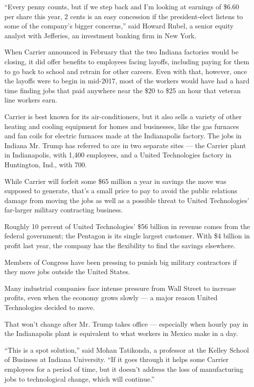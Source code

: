 ``Every penny counts, but if we step back and I'm looking at earnings of
\$6.60 per share this year, 2 cents is an easy concession if the
president-elect listens to some of the company's bigger concerns,'' said
Howard Rubel, a senior equity analyst with Jefferies, an investment
banking firm in New York.

When Carrier announced in February that the two Indiana factories would
be closing, it did offer benefits to employees facing layoffs, including
paying for them to go back to school and retrain for other careers. Even
with that, however, once the layoffs were to begin in mid-2017, most of
the workers would have had a hard time finding jobs that paid anywhere
near the \$20 to \$25 an hour that veteran line workers earn.

Carrier is best known for its air-conditioners, but it also sells a
variety of other heating and cooling equipment for homes and businesses,
like the gas furnaces and fan coils for electric furnaces made at the
Indianapolis factory. The jobs in Indiana Mr. Trump has referred to are
in two separate sites --- the Carrier plant in Indianapolis, with 1,400
employees, and a United Technologies factory in Huntington, Ind., with
700.

While Carrier will forfeit some \$65 million a year in savings the move
was supposed to generate, that's a small price to pay to avoid the
public relations damage from moving the jobs as well as a possible
threat to United Technologies' far-larger military contracting business.

Roughly 10 percent of United Technologies' \$56 billion in revenue comes
from the federal government; the Pentagon is its single largest
customer. With \$4 billion in profit last year, the company has the
flexibility to find the savings elsewhere.

Members of Congress have been pressing to punish big military
contractors if they move jobs outside the United States.

Many industrial companies face intense pressure from Wall Street to
increase profits, even when the economy grows slowly --- a major reason
United Technologies decided to move.

That won't change after Mr. Trump takes office --- especially when
hourly pay in the Indianapolis plant is equivalent to what workers in
Mexico make in a day.

``This is a spot solution,'' said Mohan Tatikonda, a professor at the
Kelley School of Business at Indiana University. ``If it goes through it
helps some Carrier employees for a period of time, but it doesn't
address the loss of manufacturing jobs to technological change, which
will continue.''

